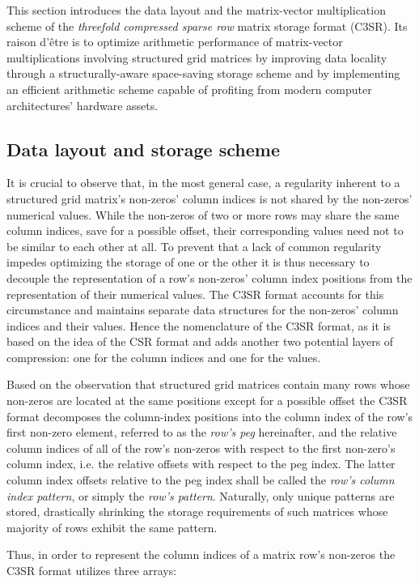 \documentclass{article}
\begin{document}
  This section introduces the data layout and the matrix-vector multiplication scheme of the \emph{threefold compressed sparse row} matrix storage format (C3SR). Its raison d'être is to optimize arithmetic performance of matrix-vector multiplications involving structured grid matrices by improving data locality through a structurally-aware space-saving storage scheme and by implementing an efficient arithmetic scheme capable of profiting from modern computer architectures' hardware assets.

  \subsection{Data layout and storage scheme}

    It is crucial to observe that, in the most general case, a regularity inherent to a structured grid matrix's non-zeros' column indices is not shared by the non-zeros' numerical values. While the non-zeros of two or more rows may share the same column indices, save for a possible offset, their corresponding values need not to be similar to each other at all. To prevent that a lack of common regularity impedes optimizing the storage of one or the other it is thus necessary to decouple the representation of a row's non-zeros' column index positions from the representation of their numerical values. The C3SR format accounts for this circumstance and maintains separate data structures for the non-zeros' column indices and their values. Hence the nomenclature of the C3SR format, as it is based on the idea of the CSR format and adds another two potential layers of compression: one for the column indices and one for the values.

    Based on the observation that structured grid matrices contain many rows whose non-zeros are located at the same positions except for a possible offset the C3SR format decomposes the column-index positions into the column index of the row's first non-zero element, referred to as the \emph{row's peg} hereinafter, and the relative column indices of all of the row's non-zeros with respect to the first non-zero's column index, i.e. the relative offsets with respect to the peg index. The latter column index offsets relative to the peg index shall be called the \emph{row's column index pattern}, or simply the \emph{row's pattern}. Naturally, only unique patterns are stored, drastically shrinking the storage requirements of such matrices whose majority of rows exhibit the same pattern.

    Thus, in order to represent the column indices of a matrix row's non-zeros the C3SR format utilizes three arrays:
\end{document}
